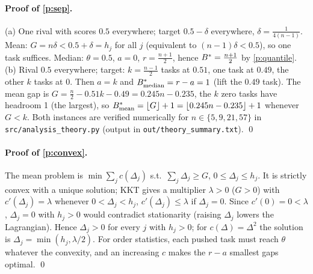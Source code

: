 \paragraph{Proof of \cref{p:sep}.}
(a) One rival with scores $0.5$ everywhere; target $0.5-\delta$ everywhere, $\delta=\frac{1}{4(n-1)}$. Mean: $G=n\delta<0.5+\delta=h_j$ for all $j$ (equivalent to $(n-1)\delta<0.5$), so one task suffices. Median: $\theta=0.5$, $a=0$, $r=\frac{n+1}2$, hence $B^{\ast}=\frac{n+1}{2}$ by \cref{p:quantile}.
(b) Rival $0.5$ everywhere; target: $k=\frac{n-1}2$ tasks at $0.51$, one task at $0.49$, the other $k$ tasks at $0$. Then $a=k$ and $B^{\ast}_{\text{median}}=r-a=1$ (lift the $0.49$ task). The mean gap is $G=\frac n2-0.51k-0.49=0.245n-0.235$, the $k$ zero tasks have headroom 1 (the largest), so $B^{\ast}_{\text{mean}}=\lfloor G\rfloor+1=\lfloor 0.245n-0.235\rfloor+1$ whenever $G<k$. Both instances are verified numerically for $n\in\{5,9,21,57\}$ in \texttt{src/analysis\_theory.py} (output in \texttt{out/theory\_summary.txt}). \qed

\paragraph{Proof of \cref{p:convex}.}
The mean problem is $\min\sum_jc(\Delta_j)$ s.t.\ $\sum_j\Delta_j\ge G$, $0\le\Delta_j\le h_j$. It is strictly convex with a unique solution; KKT gives a multiplier $\lambda>0$ ($G>0$) with $c'(\Delta_j)=\lambda$ whenever $0<\Delta_j<h_j$, $c'(\Delta_j)\le\lambda$ if $\Delta_j=0$. Since $c'(0)=0<\lambda$, $\Delta_j=0$ with $h_j>0$ would contradict stationarity (raising $\Delta_j$ lowers the Lagrangian). Hence $\Delta_j>0$ for every $j$ with $h_j>0$; for $c(\Delta)=\Delta^2$ the solution is $\Delta_j=\min(h_j,\lambda/2)$. For order statistics, each pushed task must reach $\theta$ whatever the convexity, and an increasing $c$ makes the $r-a$ smallest gaps optimal. \qed

